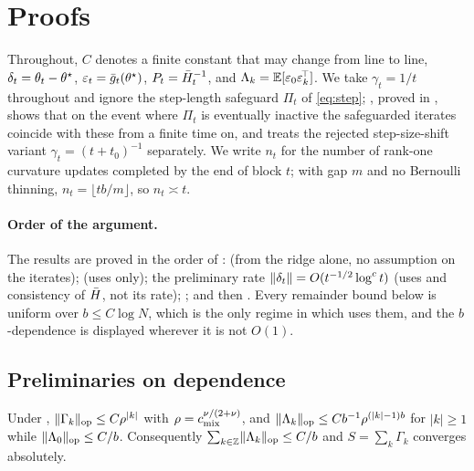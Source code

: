 \section{Proofs}
\label{app:proofs}

Throughout, $C$ denotes a finite constant that may change from line to line,
$\delta_t=\theta_t-\theta^\star$, $\varepsilon_t=\bar{g}_t(\theta^\star)$, $P_t=\bar{H}_t^{-1}$, and
$\Lambda_k=\mathbb{E}[\varepsilon_0\varepsilon_k^{\!\top}]$. We take $\gamma_t=1/t$ throughout and ignore the
step-length safeguard $\Pi_t$ of \eqref{eq:step}; , proved in
, shows that on the event where $\Pi_t$ is eventually inactive the safeguarded
iterates coincide with these from a finite time on, and  treats the rejected
step-size-shift variant $\gamma_t=(t+t_0)^{-1}$ separately.
We write $n_t$ for the number of rank-one curvature
updates completed by the end of block $t$; with gap $m$ and no Bernoulli thinning,
$n_t=\lfloor tb/m\rfloor$, so $n_t\asymp t$.

\paragraph{Order of the argument.} The results are proved in the order of
:  (from the ridge alone, no assumption on the iterates);
 (uses  only); the preliminary rate
$\lVert \delta_t \rVert=O(t^{-1/2}\log^{c}t)$ (uses  and consistency of $\bar{H}$, not its
rate); ; and then . Every remainder bound
below is uniform over $b\le C\log N$, which is the only regime in which  uses
them, and the $b$-dependence is displayed wherever it is not $O(1)$.

\subsection{Preliminaries on dependence}

\begin{lemma}
\label{lem:davydov}
Under , $\lVert \Gamma_k \rVert_{\mathrm{op}}\le C\rho^{|k|}$ with $\rho=c_{\mathrm{mix}}^{\nu/(2+\nu)}$,
and $\lVert \Lambda_k \rVert_{\mathrm{op}}\le C b^{-1}\rho^{(|k|-1)b}$ for $|k|\ge1$ while
$\lVert \Lambda_0 \rVert_{\mathrm{op}}\le C/b$. Consequently $\sum_{k\in\mathbb Z}\lVert \Lambda_k \rVert_{\mathrm{op}}\le C/b$
and $S=\sum_k\Gamma_k$ converges absolutely.
\end{lemma}

